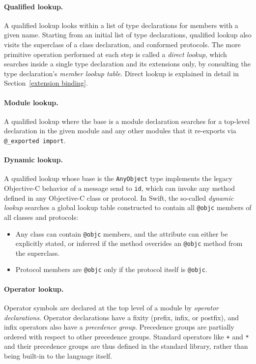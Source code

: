\documentclass[../generics]{subfiles}
\begin{document}
\paragraph{Qualified lookup.}
A qualified lookup looks within a list of type declarations for members with a given name. Starting from an initial list of type declarations, qualified lookup also visits the superclass of a class declaration, and conformed protocols. The more primitive operation performed at each step is called a \emph{direct lookup}, which searches inside a single type declaration and its extensions only, by consulting the type declaration's \emph{member lookup table}. Direct lookup is explained in detail in Section~\ref{extension binding}.

\paragraph{Module lookup.} A qualified lookup where the base is a module declaration searches for a top-level declaration in the given module and any other modules that it re-exports via \texttt{@\_exported import}.

\paragraph{Dynamic lookup.} A qualified lookup whose base is the \texttt{AnyObject} type implements the legacy Objective-C behavior of a message send to \texttt{id}, which can invoke any method defined in any Objective-C class or protocol. In Swift, the so-called \emph{dynamic lookup} searches a global lookup table constructed to contain all \texttt{@objc} members of all classes and protocols:
\begin{itemize}
\item Any class can contain \texttt{@objc} members, and the attribute can either be explicitly stated, or inferred if the method overrides an \texttt{@objc} method from the superclass.
\item Protocol members are \texttt{@objc} only if the protocol itself is \texttt{@objc}.
\end{itemize}

\paragraph{Operator lookup.}
Operator symbols are declared at the top level of a module by \emph{operator declarations}. Operator declarations have a fixity (prefix, infix, or postfix), and infix operators also have a \emph{precedence group}. Precedence groups are partially ordered with respect to other precedence groups. Standard operators like \texttt{+} and \texttt{*} and their precedence groups are thus defined in the standard library, rather than being built-in to the language itself.
\end{document}
